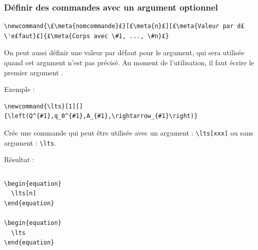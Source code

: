 \documentclass{beamer}
\newcommand{\lts}[1][]{\ensuremath\left(Q^{#1}, q_0^{#1}, A_{#1}, \rightarrow_{#1}\right)}
\begin{document}
\begin{frame}[fragile]
  \frametitle{Définir des commandes avec un argument optionnel}

\begin{lstlisting}
\newcommand{\£\meta{nomcommande}£}[£\meta{n}£][£\meta{Valeur par d£\'e£faut}£]{£\meta{Corps avec \#1, ..., \#n}£}
\end{lstlisting}
On peut aussi définir une valeur par défaut pour le  argument, qui sera utilisée quand cet argument n'est pas précisé.
Au moment de l'utilisation, il faut écrire le premier argument .

\bigskip
Exemple :
\begin{lstlisting}
\newcommand{\lts}[1][]{\left(Q^{#1},q_0^{#1},A_{#1},\rightarrow_{#1}\right)}
\end{lstlisting}
Crée une commande qui peut être utilisée avec un argument : \lstinline?\lts[xxx]?
ou sans argument : \lstinline?\lts?.

\bigskip
Résultat :
\begin{columns}
\begin{column}{.45\textwidth}
\begin{lstlisting}
\begin{equation}
  \lts[n]
\end{equation}

\begin{equation}
  \lts
\end{equation}
\end{lstlisting}
\end{column}

\begin{column}{.45\textwidth}
\myex{%
\begin{equation}
  \lts[n]
\end{equation}

\begin{equation}
  \lts
\end{equation}
}
\end{column}
\end{columns}

\end{frame}
\end{document}
